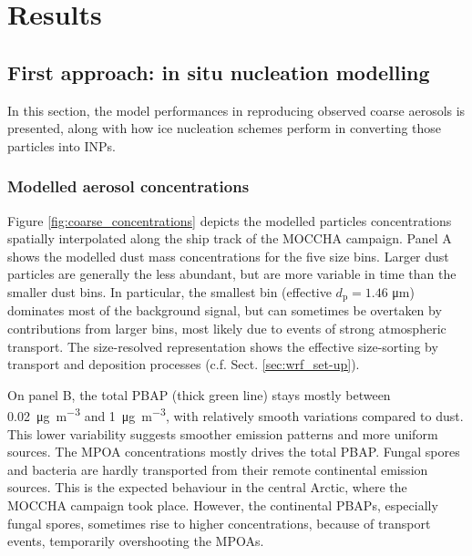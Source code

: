     
    
    
    
    
\section{Results}
\label{sec:results_chap4}
    \subsection{First approach: in situ nucleation modelling}
    \label{sec:first_approach}
    In this section, the model performances in reproducing observed coarse aerosols is presented, along with how ice nucleation schemes perform in converting those particles into INPs.
    
        \subsubsection{Modelled aerosol concentrations}
        \label{sec:aer_emissions}
        Figure \ref{fig:coarse_concentrations} depicts the modelled particles concentrations spatially interpolated along the ship track of the MOCCHA campaign.
        Panel A shows the modelled dust mass concentrations for the five size bins.
        Larger dust particles are generally the less abundant, but are more variable in time than the smaller dust bins.
        In particular, the smallest bin (effective $d_{\text{p}} = 1.46$ \si{\um}) dominates most of the background signal, but can sometimes be overtaken by contributions from larger bins, most likely due to events of strong atmospheric transport.
        The size-resolved representation shows the effective size-sorting by transport and deposition processes (c.f. Sect. \ref{sec:wrf_set-up}).
        
        On panel B, the total PBAP (thick green line) stays mostly between \SI{0.02}{\ug\per\cubic\metre} and \SI{1}{\ug\per\cubic\metre}, with relatively smooth variations compared to dust.
        This lower variability suggests smoother emission patterns and more uniform sources.
        The MPOA concentrations mostly drives the total PBAP. Fungal spores and bacteria are hardly transported from their remote continental emission sources. This is the expected behaviour in the central Arctic, where the MOCCHA campaign took place.
        However, the continental PBAPs, especially fungal spores,  sometimes rise to higher concentrations, because of transport events, temporarily overshooting the MPOAs.
        
